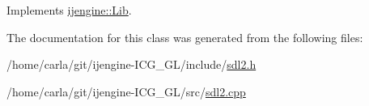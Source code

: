 Implements \hyperlink{classijengine_1_1Lib_a0fdaa7786c6bd7afaab1be8d58224630}{ijengine\-::\-Lib}.



The documentation for this class was generated from the following files\-:\begin{DoxyCompactItemize}
\item 
/home/carla/git/ijengine-\/\-I\-C\-G\-\_\-\-G\-L/include/\hyperlink{sdl2_8h}{sdl2.\-h}\item 
/home/carla/git/ijengine-\/\-I\-C\-G\-\_\-\-G\-L/src/\hyperlink{sdl2_8cpp}{sdl2.\-cpp}\end{DoxyCompactItemize}
